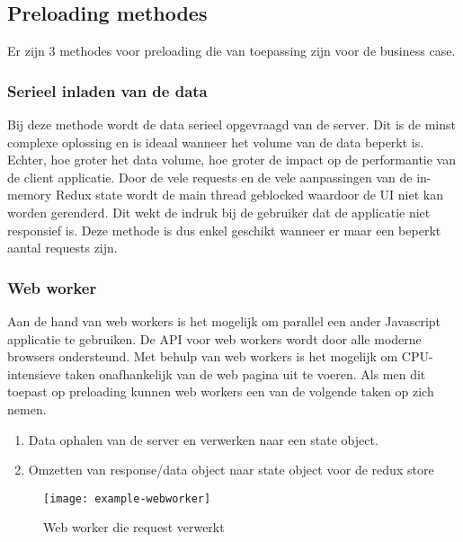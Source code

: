 \subsection{Preloading methodes}
Er zijn 3 methodes voor preloading die van toepassing zijn voor de business case.

\subsubsection{Serieel inladen van de data}
Bij deze methode wordt de data serieel opgevraagd van de server. Dit is de minst complexe oplossing en is ideaal wanneer het volume van de data beperkt is. Echter, hoe groter het data volume, hoe groter de impact op de performantie van de client applicatie. Door de vele requests en de vele aanpassingen van de in-memory Redux state wordt de main thread geblocked waardoor de UI niet kan worden gerenderd. Dit wekt de indruk bij de gebruiker dat de applicatie niet responsief is. Deze methode is dus enkel geschikt wanneer er maar een beperkt aantal requests zijn.

\subsubsection{Web worker}
\label{sssec: web-worker}
Aan de hand van web workers is het mogelijk om parallel een ander Javascript applicatie te gebruiken. De API voor web workers wordt door alle \autocite{web-worker-support} moderne browsers ondersteund. Met behulp van web workers is het mogelijk om CPU-intensieve taken onafhankelijk van de web pagina uit te voeren. Als men dit toepast op preloading kunnen web workers een van de volgende taken op zich nemen.

\begin{enumerate}
\item Data ophalen van de server en verwerken naar een state object.
\item Omzetten van response/data object naar state object voor de redux store
\end{enumerate}

\begin{figure}[h]
\caption{Web worker die request verwerkt}
\centering
\texttt{[image: example-webworker]}
\end{figure}

